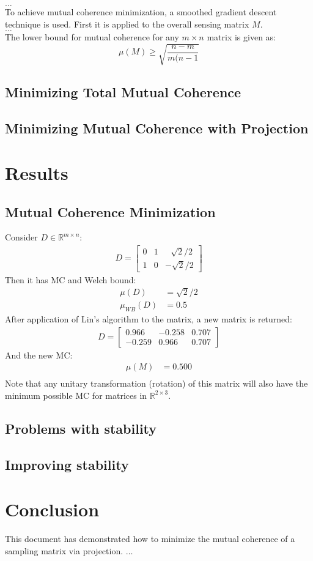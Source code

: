 \documentclass[journal]{IEEEtran}
\begin{document}
$\hdots$\\
To achieve mutual coherence minimization, a smoothed gradient descent technique is used.
First it is applied to the overall sensing matrix $M$. \\
$\hdots$\\
The lower bound for mutual coherence for any $m\times n$ matrix is given as:
\begin{equation}
\mu(M) \geq \sqrt{\frac{n - m}{m(n-1}}
\end{equation}
\subsection{Minimizing Total Mutual Coherence}

\subsection{Minimizing Mutual Coherence with Projection}


\section{Results}
\subsection{Mutual Coherence Minimization}
Consider $D \in \mathbb{R}^{m\times n}$:
\begin{align}
    D = \begin{bmatrix} 0 &1 &\>\>\>\sqrt{2}/2 \\
                        1 &0 &-\sqrt{2}/2 \end{bmatrix}
\end{align}
Then it has MC and Welch bound:
\begin{align}
\mu (D) &= \sqrt{2}/2 \\
\mu_{WB} (D) &= 0.5
\end{align}
After application of Lin's algorithm to the matrix, a new matrix is returned:
\begin{align}
    D = \left[\begin{array}{ccc} 0.966 & -0.258  &0.707\\ -0.259 & 0.966 & 0.707 \end{array}\right] 
\end{align}
And the new MC:
\begin{align}
\mu (M) &= 0.500 \\[1em]
\end{align}
Note that any unitary transformation (rotation) of this matrix will also have the minimum possible MC for
matrices in $\mathbb{R}^{2 \times 3}$.
\subsection{Problems with stability}

\subsection{Improving stability}

\section{Conclusion}
This document has demonstrated how to minimize the mutual coherence of a sampling
matrix via projection. $\ldots$
\end{document}

